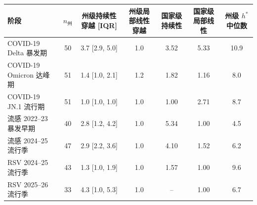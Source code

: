 \begin{tabular}{lcccccc}
\toprule
阶段 & $n_{\text{州}}$ & 州级持续性穿越 [IQR] & 州级局部线性穿越 & 国家级持续性 & 国家级局部线性 & 州级 $h^*$ 中位数 \\
\midrule
COVID-19 Delta 暴发期 & 50 & 3.7 [2.9, 5.0] & 1.0 & 3.52 & 5.33 & 10.9 \\
COVID-19 Omicron 达峰期 & 51 & 1.4 [1.0, 2.1] & 1.2 & 1.82 & 1.16 & 8.0 \\
COVID-19 JN.1 流行期 & 51 & 1.0 [1.0, 1.0] & 1.0 & 1.00 & 2.71 & 8.7 \\
流感 2022--23 暴发早期 & 40 & 2.8 [1.2, 4.2] & 1.0 & 5.34 & 1.00 & 4.5 \\
流感 2024--25 流行季 & 47 & 2.9 [2.2, 3.6] & 1.0 & 4.10 & 1.52 & 6.2 \\
RSV 2024--25 流行季 & 43 & 1.3 [1.0, 1.9] & 1.0 & 1.57 & 1.00 & 9.6 \\
RSV 2025--26 流行季 & 33 & 4.3 [1.0, 5.3] & 1.0 & -- & 1.00 & 6.7 \\
\bottomrule
\end{tabular}
